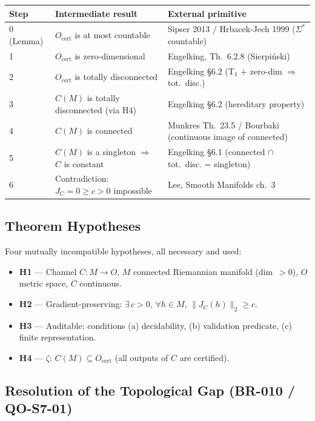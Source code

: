 \documentclass[11pt,a4paper]{article}
\theoremstyle{plain}
\begin{document}
\begin{center}
\begin{tabular}{p{0.5cm}p{5.5cm}p{5.5cm}}
\toprule
Step & Intermediate result & External primitive \\
\midrule
0 (Lemma) & $O_\text{cert}$ is at most countable &
Sipser 2013 / Hrbacek-Jech 1999 ($\Sigma^*$ countable) \\
1 & $O_\text{cert}$ is zero-dimensional &
Engelking, Th.\ 6.2.8 (Sierpi{\'n}ski) \\
2 & $O_\text{cert}$ is totally disconnected &
Engelking \S6.2 (T$_1$ + zero-dim $\Rightarrow$ tot.\ disc.) \\
3 & $C(M)$ is totally disconnected (via H4) &
Engelking \S6.2 (hereditary property) \\
4 & $C(M)$ is connected &
Munkres Th.\ 23.5 / Bourbaki (continuous image of connected) \\
5 & $C(M)$ is a singleton $\Rightarrow$ $C$ is constant &
Engelking \S6.1 (connected $\cap$ tot.\ disc. = singleton) \\
6 & Contradiction: $J_C = 0 \ge c > 0$ impossible &
Lee, Smooth Manifolds ch.~3 \\
\bottomrule
\end{tabular}
\end{center}

\subsection{Theorem Hypotheses}

Four mutually incompatible hypotheses, all necessary and used:
\begin{itemize}[leftmargin=*]
\item \textbf{H1} --- Channel $C: M \to O$, $M$ connected Riemannian manifold (dim~$> 0$), $O$ metric space, $C$ continuous.
\item \textbf{H2} --- Gradient-preserving: $\exists\, c > 0$, $\forall h \in M$, $\|J_C(h)\|_2 \ge c$.
\item \textbf{H3} --- Auditable: conditions (a) decidability, (b) validation predicate, (c) finite representation.
\item \textbf{H4} --- $\zeta$: $C(M) \subseteq O_\text{cert}$ (all outputs of $C$ are certified).
\end{itemize}

\subsection{Resolution of the Topological Gap (BR-010 / QO-S7-01)}
\end{document}
